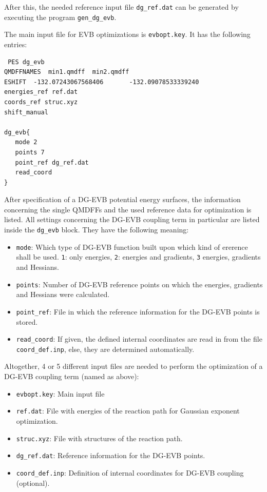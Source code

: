 \documentclass[12pt,a4paper]{scrartcl}
\begin{document}
After this, the needed reference input file \texttt{dg\_ref.dat} can be generated 
by executing the program \texttt{gen\_dg\_evb}. 




The main input file for EVB optimizations is \texttt{evbopt.key}. It has the following 
entries:

\begin{verbatim}
 PES dg_evb
QMDFFNAMES  min1.qmdff  min2.qmdff
ESHIFT  -132.07243067568406       -132.09078533339240
energies_ref ref.dat
coords_ref struc.xyz
shift_manual

dg_evb{
   mode 2
   points 7
   point_ref dg_ref.dat
   read_coord
}
\end{verbatim}

After specification of a DG-EVB potential energy surfaces, the information concerning the 
single QMDFFs and the used reference data for optimization is listed.
All settings concerning the DG-EVB coupling term in particular are listed inside the 
\texttt{dg\_evb} block. They have the following meaning:

\begin{itemize}
 \item \texttt{mode}: Which type of DG-EVB function built upon which kind of ererence 
    shall be used. \texttt{1}: only energies, \texttt{2}: energies and gradients, \texttt{3}
    energies, gradients and Hessians.
 \item \texttt{points}: Number of DG-EVB reference points on which the energies, gradients 
    and Hessians were calculated.
 \item \texttt{point\_ref}: File in which the reference information for the DG-EVB points 
    is stored.
 \item \texttt{read\_coord}: If given, the defined internal coordinates are read in from the 
    file \texttt{coord\_def.inp}, else, they are determined automatically.
\end{itemize}

Altogether, 4 or 5 different input files are needed to perform the optimization of a DG-EVB 
coupling term (named as above):

\begin{itemize}
 \item \texttt{evbopt.key}: Main input file 
 \item \texttt{ref.dat}: File with energies of the reaction path for Gaussian exponent 
     optimization.
 \item \texttt{struc.xyz}: File with structures of the reaction path.
 \item \texttt{dg\_ref.dat}: Reference information for the DG-EVB points.
 \item \texttt{coord\_def.inp}: Definition of internal coordinates for DG-EVB coupling (optional).
\end{itemize}
\end{document}
